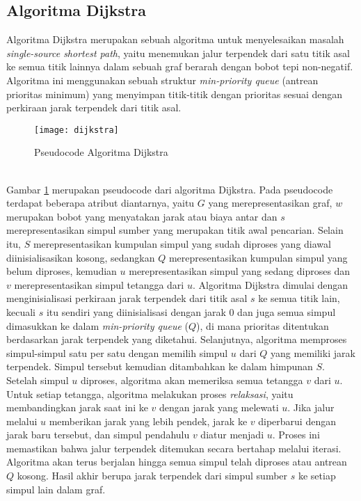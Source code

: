 \subsection{Algoritma Dijkstra ~\cite{Cormen:09:intro}}
\label{sec:dijkstra}
Algoritma Dijkstra merupakan sebuah algoritma untuk menyelesaikan masalah \textit{single-source shortest path}, yaitu menemukan jalur terpendek dari satu titik asal ke semua titik lainnya dalam sebuah graf berarah dengan bobot tepi non-negatif. Algoritma ini menggunakan sebuah struktur \textit{min-priority queue} (antrean prioritas minimum) yang menyimpan titik-titik dengan prioritas sesuai dengan perkiraan jarak terpendek dari titik asal.
\begin{figure}[H] 
    \centering  
    \texttt{[image: dijkstra]}  
    \caption{Pseudocode Algoritma Dijkstra}
    \label{fig:pseudocodedijkstra} 
\end{figure}
\noindent
\\
Gambar \ref{fig:pseudocodedijkstra} merupakan pseudocode dari algoritma Dijkstra. Pada pseudocode terdapat beberapa atribut diantarnya, yaitu $G$ yang merepresentasikan graf, $w$ merupakan bobot yang menyatakan jarak atau biaya antar dan $s$ merepresentasikan simpul sumber yang merupakan titik awal pencarian. Selain itu, $S$ merepresentasikan kumpulan simpul yang sudah diproses yang diawal diinisialisasikan kosong, sedangkan $Q$ merepresentasikan kumpulan simpul yang belum diproses, kemudian $u$ merepresentasikan simpul yang sedang diproses dan $v$ merepresentasikan simpul tetangga dari $u$. Algoritma Dijkstra dimulai dengan menginisialisasi perkiraan jarak terpendek dari titik asal $s$ ke semua titik lain, kecuali $s$ itu sendiri yang diinisialisasi dengan jarak 0 dan juga semua simpul dimasukkan ke dalam \textit{min-priority queue} ($Q$), di mana prioritas ditentukan berdasarkan jarak terpendek yang diketahui. Selanjutnya, algoritma memproses simpul-simpul satu per satu dengan memilih simpul $u$ dari $Q$ yang memiliki jarak terpendek. Simpul tersebut kemudian ditambahkan ke dalam himpunan $S$.
\\
Setelah simpul $u$ diproses, algoritma akan memeriksa semua tetangga $v$ dari $u$. Untuk setiap tetangga, algoritma melakukan proses \textit{relaksasi}, yaitu membandingkan jarak saat ini ke $v$ dengan jarak yang melewati $u$. Jika jalur melalui $u$ memberikan jarak yang lebih pendek, jarak ke $v$ diperbarui dengan jarak baru tersebut, dan simpul pendahulu $v$ diatur menjadi $u$. Proses ini memastikan bahwa jalur terpendek ditemukan secara bertahap melalui iterasi. Algoritma akan terus berjalan hingga semua simpul telah diproses atau antrean $Q$ kosong. Hasil akhir berupa jarak terpendek dari simpul sumber $s$ ke setiap simpul lain dalam graf.

